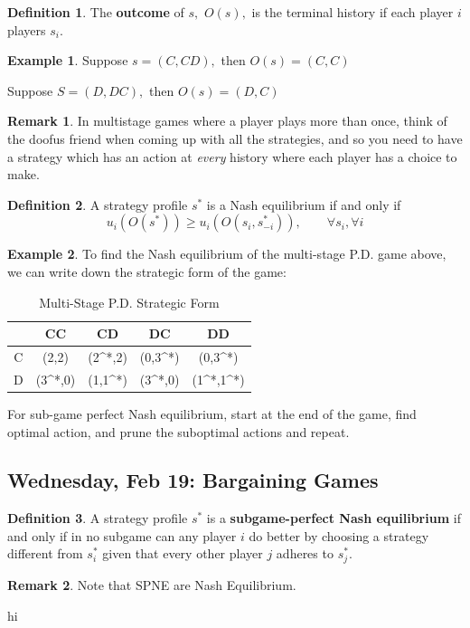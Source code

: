 \documentclass[10pt, oneside]{article}
\theoremstyle{definition}
\newtheorem{exmp}{Example}[section]
\newtheorem{defn}{Definition}
\newtheorem{rem}{Remark}
\begin{document}
\begin{defn}
    The \textbf{outcome} of $s,$ $O(s),$ is the terminal history if each player $i$ players $s_i.$
\end{defn}
\begin{exmp}
    Suppose $s = (C,CD),$ then $O(s) = (C,C)$

    Suppose $S = (D,DC),$ then $O(s)  = (D,C)$
\end{exmp}

\begin{rem}
    In multistage games where a player plays more than once, think of the doofus friend when coming up with all the strategies, and so you need to have a strategy which has an action at \textit{every} history where each player has a choice to make.
\end{rem}
\begin{defn}
    A strategy profile $s^*$ is a Nash equilibrium if and only if
    \[u_i(O(s^*)) \geq u_i(O(s_i, s^*_{-i})), \qquad \forall s_i, \forall i\]
\end{defn}
\begin{exmp}
    To find the Nash equilibrium of the multi-stage P.D. game above, we can write down the strategic form of the game:
    \begin{table}[H]
        \centering
        \begin{tabular}{c|c|c | c | c}
             & CC & CD & DC & DD\\
             \hline
             C& (2,2) & (2^*,2) & (0,3^*)& (0,3^*)\\
             \hline
             D&  (3^*,0)& (1,1^*) & (3^*,0) & (1^*,1^*)\\
        \end{tabular}
        \caption{Multi-Stage P.D. Strategic Form}
    \end{table}
\end{exmp}

For sub-game perfect Nash equilibrium, start at the end of the game, find optimal action, and prune the suboptimal actions and repeat. 


\newpage
\subsection{Wednesday, Feb 19: Bargaining Games}
\begin{defn}
    A strategy profile $s^*$  is a \textbf{subgame-perfect Nash equilibrium} if and only if in no subgame can any player $i$ do better by choosing a strategy different from $s_i^*$ given that every other player $j$ adheres to $s_j^*.$
\end{defn}
\begin{rem}
    Note that SPNE are Nash Equilibrium.
\end{rem}hi
\end{document}
